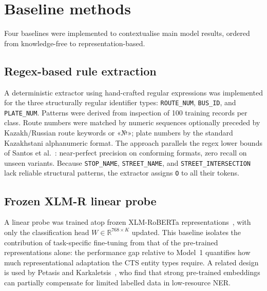 \section{Baseline methods}
\label{sec:baselines}

Four baselines were implemented to contextualise main model results, ordered from knowledge-free to representation-based.

\subsection{Regex-based rule extraction}
\label{sec:regex_baseline}

A deterministic extractor using hand-crafted regular expressions was implemented for the three structurally regular identifier types: \texttt{ROUTE\_NUM}, \texttt{BUS\_ID}, and \texttt{PLATE\_NUM}. Patterns were derived from inspection of 100 training records per class. Route numbers were matched by numeric sequences optionally preceded by Kazakh/Russian route keywords or \foreignlanguage{russian}{«№»}; plate numbers by the standard Kazakhstani alphanumeric format. The approach parallels the regex lower bounds of Santos et al.~\cite{santos2021address}: near-perfect precision on conforming formats, zero recall on unseen variants. Because \texttt{STOP\_NAME}, \texttt{STREET\_NAME}, and \texttt{STREET\_INTERSECTION} lack reliable structural patterns, the extractor assigns \texttt{O} to all their tokens.

\subsection{Frozen XLM-R linear probe}
\label{sec:frozen_baseline}

A linear probe was trained atop frozen XLM-RoBERTa representations~\cite{conneau2020xlmr}, with only the classification head $W \in \mathbb{R}^{768 \times K}$ updated. This baseline isolates the contribution of task-specific fine-tuning from that of the pre-trained representations alone: the performance gap relative to Model~1 quantifies how much representational adaptation the CTS entity types require. A related design is used by Petasis and Karkaletsis~\cite{petasis2024greek}, who find that strong pre-trained embeddings can partially compensate for limited labelled data in low-resource NER.

